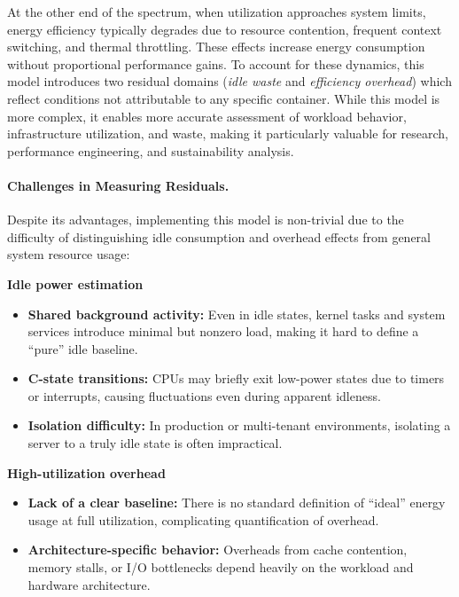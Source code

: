 At the other end of the spectrum, when utilization approaches system limits, energy efficiency typically degrades due to resource contention, frequent context switching, and thermal throttling\parencite{harchol2013performance}. These effects increase energy consumption without proportional performance gains. To account for these dynamics, this model introduces two residual domains (\textit{idle waste} and \textit{efficiency overhead}) which reflect conditions not attributable to any specific container. While this model is more complex, it enables more accurate assessment of workload behavior, infrastructure utilization, and waste, making it particularly valuable for research, performance engineering, and sustainability analysis.

\paragraph{Challenges in Measuring Residuals.} 
Despite its advantages, implementing this model is non-trivial due to the difficulty of distinguishing idle consumption and overhead effects from general system resource usage:

\textbf{Idle power estimation}
\begin{itemize}
    \item \textbf{Shared background activity:} Even in idle states, kernel tasks and system services introduce minimal but nonzero load, making it hard to define a “pure” idle baseline.
    \item \textbf{C-state transitions:} CPUs may briefly exit low-power states due to timers or interrupts, causing fluctuations even during apparent idleness.
    \item \textbf{Isolation difficulty:} In production or multi-tenant environments, isolating a server to a truly idle state is often impractical.
\end{itemize}

\textbf{High-utilization overhead}
\begin{itemize}
    \item \textbf{Lack of a clear baseline:} There is no standard definition of “ideal” energy usage at full utilization, complicating quantification of overhead.
    \item \textbf{Architecture-specific behavior:} Overheads from cache contention, memory stalls, or I/O bottlenecks depend heavily on the workload and hardware architecture.
\end{itemize}

